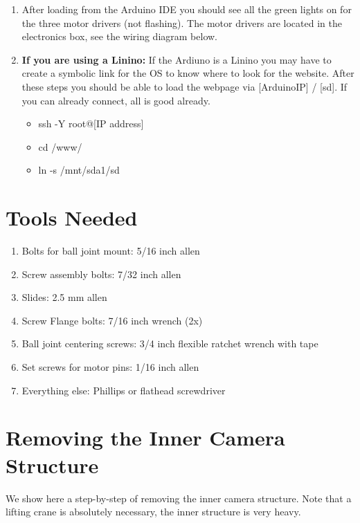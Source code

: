 \documentclass[11pt]{article}
\begin{document}
\begin{enumerate}
\item After loading from the Arduino IDE you should see all the green lights on for the three motor drivers (not flashing).  
The motor drivers are located in the electronics box, see the wiring diagram below.

\item {\textbf{If you are using a Linino:}}  If the Ardiuno is a Linino you may have to create a symbolic link for the OS to know where to look for the website.  
After these steps you should be able to load the webpage via [ArduinoIP] / [sd].  
If you can already connect, all is good already.
	\begin{itemize}
		\item ssh -Y root@[IP address]
		\item cd /www/
		\item ln -s /mnt/sda1/sd
	\end{itemize}
\end{enumerate}


\section{Tools Needed}
\begin{enumerate}
	\item[]Bolts for ball joint mount: 5/16 inch allen
	\item[]Screw assembly bolts: 7/32 inch allen 
	\item[]Slides: 2.5 mm allen
	\item[]Screw Flange bolts: 7/16 inch wrench (2x)
	\item[]Ball joint centering screws: 3/4 inch flexible ratchet wrench with tape
	\item[]Set screws for motor pins: 1/16 inch allen
	\item[]Everything else: Phillips or flathead screwdriver
\end{enumerate}


\section{Removing the Inner Camera Structure}
We show here a step-by-step of removing the inner camera structure.  
Note that a lifting crane is absolutely necessary, the inner structure is very heavy.
\end{document}
